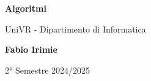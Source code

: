 \begin{titlepage}
	\begin{center}
		\vspace*{1cm}

		\Huge
		\textbf{Algoritmi}

		\vspace{0.5cm}
		\LARGE
		UniVR - Dipartimento di Informatica

		\vspace{1.5cm}

		\textbf{Fabio Irimie}

		\vfill


		\vspace{0.8cm}


		2° Semestre 2024/2025

	\end{center}
\end{titlepage}
